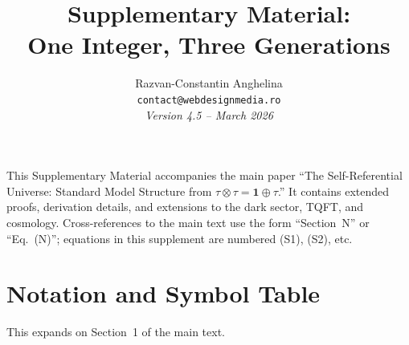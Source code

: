 \documentclass[12pt,a4paper]{article}
\title{\textbf{Supplementary Material:\\
One Integer, Three Generations}}
\author{
Razvan-Constantin Anghelina\\
\texttt{contact@webdesignmedia.ro}\\[1em]
\textit{Version 4.5 -- March 2026}
}
\date{}
\theoremstyle{definition}
\begin{document}
\maketitle

\noindent This Supplementary Material accompanies the main paper ``The Self-Referential Universe: Standard Model Structure from $\tau \otimes \tau = \mathbf{1} \oplus \tau$.''  It contains extended proofs, derivation details, and extensions to the dark sector, TQFT, and cosmology.  Cross-references to the main text use the form ``Section~N'' or ``Eq.~(N)''; equations in this supplement are numbered (S1), (S2), etc.

\tableofcontents
\newpage

\section{Notation and Symbol Table}
\label{sec:S-notation}

This expands on Section~1 of the main text.
\end{document}
